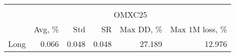 \begin{tabular}{lrrrrr}
\hline \hline \\ [-1.8ex]
 & \multicolumn{5}{c}{OMXC25} \\
 \cmidrule(lr){2-6}
  & Avg, \% & Std & SR & Max DD, \% & Max 1M loss, \% \\
\midrule
Long & 0.066 & 0.048 & 0.048 & 27.189 & 12.976 \\
\hline \hline
\end{tabular}